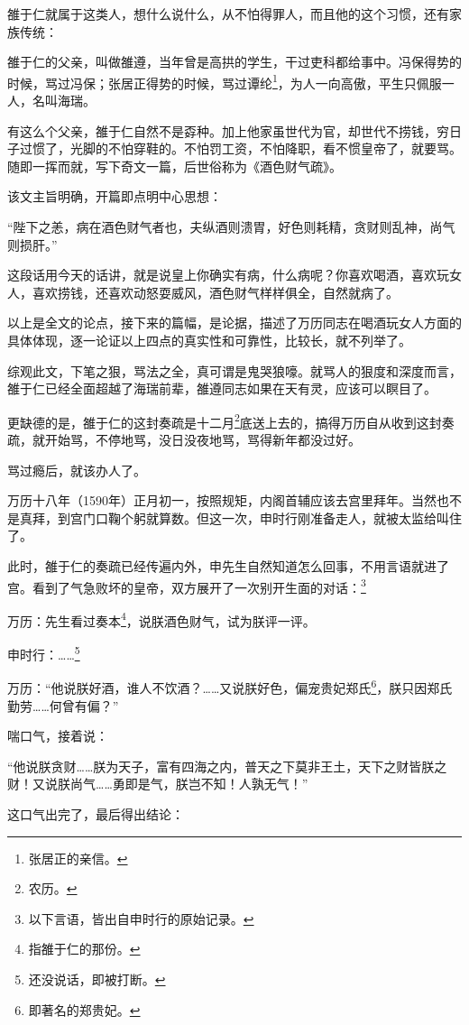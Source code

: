 \begin{multicols}{\theparacolNo}
		雒于仁就属于这类人，想什么说什么，从不怕得罪人，而且他的这个习惯，还有家族传统：

		雒于仁的父亲，叫做雒遵，当年曾是高拱的学生，干过吏科都给事中。冯保得势的时候，骂过冯保；张居正得势的时候，骂过谭纶\footnote{张居正的亲信。}，为人一向高傲，平生只佩服一人，名叫海瑞。

		有这么个父亲，雒于仁自然不是孬种。加上他家虽世代为官，却世代不捞钱，穷日子过惯了，光脚的不怕穿鞋的。不怕罚工资，不怕降职，看不惯皇帝了，就要骂。随即一挥而就，写下奇文一篇，后世俗称为《酒色财气疏》。

		该文主旨明确，开篇即点明中心思想：

		“陛下之恙，病在酒色财气者也，夫纵酒则溃胃，好色则耗精，贪财则乱神，尚气则损肝。”

		这段话用今天的话讲，就是说皇上你确实有病，什么病呢？你喜欢喝酒，喜欢玩女人，喜欢捞钱，还喜欢动怒耍威风，酒色财气样样俱全，自然就病了。

		以上是全文的论点，接下来的篇幅，是论据，描述了万历同志在喝酒玩女人方面的具体体现，逐一论证以上四点的真实性和可靠性，比较长，就不列举了。

		综观此文，下笔之狠，骂法之全，真可谓是鬼哭狼嚎。就骂人的狠度和深度而言，雒于仁已经全面超越了海瑞前辈，雒遵同志如果在天有灵，应该可以瞑目了。

		更缺德的是，雒于仁的这封奏疏是十二月\footnote{农历。}底送上去的，搞得万历自从收到这封奏疏，就开始骂，不停地骂，没日没夜地骂，骂得新年都没过好。

		骂过瘾后，就该办人了。

		万历十八年（1590年）正月初一，按照规矩，内阁首辅应该去宫里拜年。当然也不是真拜，到宫门口鞠个躬就算数。但这一次，申时行刚准备走人，就被太监给叫住了。

		此时，雒于仁的奏疏已经传遍内外，申先生自然知道怎么回事，不用言语就进了宫。看到了气急败坏的皇帝，双方展开了一次别开生面的对话：\footnote{以下言语，皆出自申时行的原始记录。}

		万历：先生看过奏本\footnote{指雒于仁的那份。}，说朕酒色财气，试为朕评一评。

		申时行：……\footnote{还没说话，即被打断。}

		万历：“他说朕好酒，谁人不饮酒？……又说朕好色，偏宠贵妃郑氏\footnote{即著名的郑贵妃。}，朕只因郑氏勤劳……何曾有偏？”

		喘口气，接着说：

		“他说朕贪财……朕为天子，富有四海之内，普天之下莫非王土，天下之财皆朕之财！又说朕尚气……勇即是气，朕岂不知！人孰无气！”

		这口气出完了，最后得出结论：


\end{multicols}
